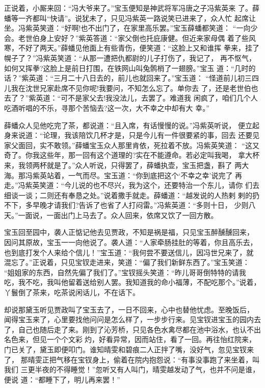 正说着，小厮来回：“冯大爷来了。”宝玉便知是神武将军冯唐之子冯紫英来
了。薛蟠等一齐都叫“快请”。说犹未了，只见冯紫英一路说笑已进来了，众人忙
起席让坐。冯紫英笑道：“好啊!也不出门了，在家里高乐罢。”宝玉薛蟠都笑道：
“一向少会。老世伯身上安好？”紫英答道：“家父倒也托庇康健。但近来家母偶
着了些风寒，不好了两天。”薛蟠见他面上有些青伤，便笑道：“这脸上又和谁挥
拳来，挂了幌子了？”冯紫英笑道：“从那一遭把仇都尉的儿子打伤了，我记了，
再不怄气，如何又挥拳?这脸上是前日打围，在铁网山叫兔鹘梢了一翅膀。”宝玉
道：“几时的话？”紫英道：“三月二十八日去的，前儿也就回来了。”宝玉道：
“怪道前儿初三四儿我在沈世兄家赴席不见你呢!我要问，不知怎么忘了。单你去
了，还是老世伯也去了？”紫英道：“可不是家父去!我没法儿，去罢了。难道我
闲疯了，咱们几个人吃酒听唱的不乐，寻那个苦恼去?这一次，大不幸之中却有大
幸。”

薛蟠众人见他吃完了茶，都说道：“且入席，有话慢慢的说。”冯紫英听说，
便立起身来说道：“论理，我该陪饮几杯才是，只是今儿有一件很要紧的事，回去
还要见家父面回，实不敢领。”薛蟠宝玉众人那里肯依，死拉着不放。冯紫英笑道：
“这又奇了。你我这些年，那一回有这个道理的?实在不能遵命。若必定叫我喝，
拿大杯来，我领两杯就是了。”众人听说，只得罢了，薛蟠执壶，宝玉把盏，斟了
两大海。那冯紫英站着，一气而尽。宝玉道：“你到底把这个‘不幸之幸’说完了
再走。”冯紫英笑道：“今儿说的也不尽兴，我为这个，还要特治一个东儿，请你
们去细谈一谈；二则还有奉恳之处。”说着撒手就走。薛蟠道：“越发说的人热剌
剌的扔不下，多早晚才请我们?告诉了也省了人打闷雷。”冯紫英道：“多则十日，
少则八天。”一面说，一面出门上马去了。众人回来，依席又饮了一回方散。

宝玉回至园中，袭人正惦记他去见贾政，不知是祸是福，只见宝玉醉醺醺回来，
因问其原故，宝玉一一向他说了。袭人道：“人家牵肠挂肚的等着，你且高乐去，
也到底打发个人来给个信儿！”宝玉道：“我何尝不要送信儿，因冯世兄来了，就
混忘了。”正说着，只见宝钗走进来，笑道：“偏了我们新鲜东西了。”宝玉笑道：
“姐姐家的东西，自然先偏了我们了。”宝钗摇头笑道：“昨儿哥哥倒特特的请我
吃，我不吃，我叫他留着送给别人罢。我知道我的命小福薄，不配吃那个。”说着，
丫鬟倒了茶来，吃茶说闲话儿，不在话下。

却说那黛玉听见贾政叫了宝玉去了，一日不回来，心中也替他忧虑。至晚饭后，
闻得宝玉来了，心里要找他问问是怎么样了，一步步行来。见宝钗进宝玉的园内去
了，自己也随后走了来。刚到了沁芳桥，只见各色水禽尽都在池中浴水，也认不出
名色来，但见一个个文彩灼，好看异常，因而站住，看了一回。再往怡红院来，
门已关了，黛玉即便叩门。谁知晴雯和碧痕二人正拌了嘴，没好气，忽见宝钗来了，
那晴雯正把气移在宝钗身上，偷着在院内抱怨说：“有事没事跑了来坐着，叫我们
三更半夜的不得睡觉！”忽听又有人叫门，晴雯越发动了气，也并不问是谁，便说
道：“都睡下了，明儿再来罢！”

